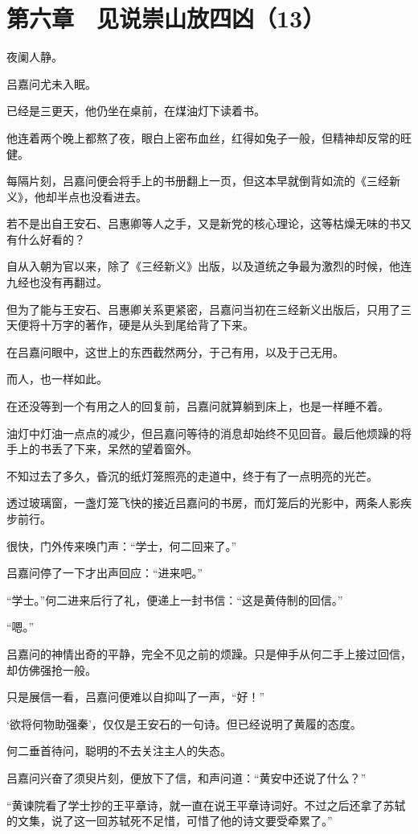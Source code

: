 \section{第六章　见说崇山放四凶（13）}

夜阑人静。

吕嘉问尤未入眠。

已经是三更天，他仍坐在桌前，在煤油灯下读着书。

他连着两个晚上都熬了夜，眼白上密布血丝，红得如兔子一般，但精神却反常的旺健。

每隔片刻，吕嘉问便会将手上的书册翻上一页，但这本早就倒背如流的《三经新义》，他却半点也没看进去。

若不是出自王安石、吕惠卿等人之手，又是新党的核心理论，这等枯燥无味的书又有什么好看的？

自从入朝为官以来，除了《三经新义》出版，以及道统之争最为激烈的时候，他连九经也没有再翻过。

但为了能与王安石、吕惠卿关系更紧密，吕嘉问当初在三经新义出版后，只用了三天便将十万字的著作，硬是从头到尾给背了下来。

在吕嘉问眼中，这世上的东西截然两分，于己有用，以及于己无用。

而人，也一样如此。

在还没等到一个有用之人的回复前，吕嘉问就算躺到床上，也是一样睡不着。

油灯中灯油一点点的减少，但吕嘉问等待的消息却始终不见回音。最后他烦躁的将手上的书丢了下来，呆然的望着窗外。

不知过去了多久，昏沉的纸灯笼照亮的走道中，终于有了一点明亮的光芒。

透过玻璃窗，一盏灯笼飞快的接近吕嘉问的书房，而灯笼后的光影中，两条人影疾步前行。

很快，门外传来唤门声：“学士，何二回来了。”

吕嘉问停了一下才出声回应：“进来吧。”

“学士。”何二进来后行了礼，便递上一封书信：“这是黄侍制的回信。”

“嗯。”

吕嘉问的神情出奇的平静，完全不见之前的烦躁。只是伸手从何二手上接过回信，却仿佛强抢一般。

只是展信一看，吕嘉问便难以自抑叫了一声，“好！”

‘欲将何物助强秦’，仅仅是王安石的一句诗。但已经说明了黄履的态度。

何二垂首待问，聪明的不去关注主人的失态。

吕嘉问兴奋了须臾片刻，便放下了信，和声问道：“黄安中还说了什么？”

“黄谏院看了学士抄的王平章诗，就一直在说王平章诗词好。不过之后还拿了苏轼的文集，说了这一回苏轼死不足惜，可惜了他的诗文要受牵累了。”

